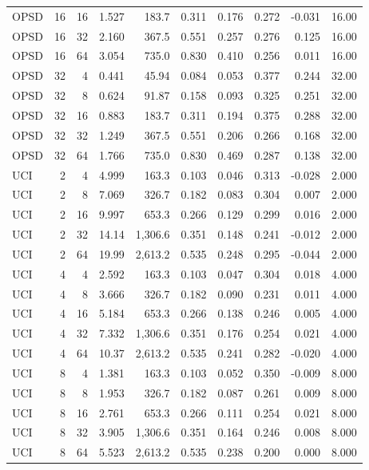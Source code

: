 \begin{longtable}{lrrrrrrrrr}
OPSD & 16 & 16 & 1.527 & 183.7 & 0.311 & 0.176 & 0.272 & -0.031 & 16.00 \\
OPSD & 16 & 32 & 2.160 & 367.5 & 0.551 & 0.257 & 0.276 & 0.125 & 16.00 \\
OPSD & 16 & 64 & 3.054 & 735.0 & 0.830 & 0.410 & 0.256 & 0.011 & 16.00 \\
OPSD & 32 & 4 & 0.441 & 45.94 & 0.084 & 0.053 & 0.377 & 0.244 & 32.00 \\
OPSD & 32 & 8 & 0.624 & 91.87 & 0.158 & 0.093 & 0.325 & 0.251 & 32.00 \\
OPSD & 32 & 16 & 0.883 & 183.7 & 0.311 & 0.194 & 0.375 & 0.288 & 32.00 \\
OPSD & 32 & 32 & 1.249 & 367.5 & 0.551 & 0.206 & 0.266 & 0.168 & 32.00 \\
OPSD & 32 & 64 & 1.766 & 735.0 & 0.830 & 0.469 & 0.287 & 0.138 & 32.00 \\
UCI & 2 & 4 & 4.999 & 163.3 & 0.103 & 0.046 & 0.313 & -0.028 & 2.000 \\
UCI & 2 & 8 & 7.069 & 326.7 & 0.182 & 0.083 & 0.304 & 0.007 & 2.000 \\
UCI & 2 & 16 & 9.997 & 653.3 & 0.266 & 0.129 & 0.299 & 0.016 & 2.000 \\
UCI & 2 & 32 & 14.14 & 1,306.6 & 0.351 & 0.148 & 0.241 & -0.012 & 2.000 \\
UCI & 2 & 64 & 19.99 & 2,613.2 & 0.535 & 0.248 & 0.295 & -0.044 & 2.000 \\
UCI & 4 & 4 & 2.592 & 163.3 & 0.103 & 0.047 & 0.304 & 0.018 & 4.000 \\
UCI & 4 & 8 & 3.666 & 326.7 & 0.182 & 0.090 & 0.231 & 0.011 & 4.000 \\
UCI & 4 & 16 & 5.184 & 653.3 & 0.266 & 0.138 & 0.246 & 0.005 & 4.000 \\
UCI & 4 & 32 & 7.332 & 1,306.6 & 0.351 & 0.176 & 0.254 & 0.021 & 4.000 \\
UCI & 4 & 64 & 10.37 & 2,613.2 & 0.535 & 0.241 & 0.282 & -0.020 & 4.000 \\
UCI & 8 & 4 & 1.381 & 163.3 & 0.103 & 0.052 & 0.350 & -0.009 & 8.000 \\
UCI & 8 & 8 & 1.953 & 326.7 & 0.182 & 0.087 & 0.261 & 0.009 & 8.000 \\
UCI & 8 & 16 & 2.761 & 653.3 & 0.266 & 0.111 & 0.254 & 0.021 & 8.000 \\
UCI & 8 & 32 & 3.905 & 1,306.6 & 0.351 & 0.164 & 0.246 & 0.008 & 8.000 \\
UCI & 8 & 64 & 5.523 & 2,613.2 & 0.535 & 0.238 & 0.200 & 0.000 & 8.000 \\

\end{longtable}
